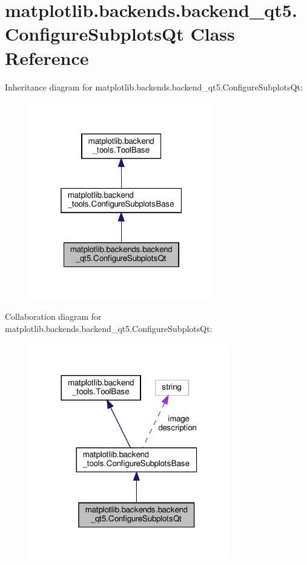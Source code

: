 \hypertarget{classmatplotlib_1_1backends_1_1backend__qt5_1_1ConfigureSubplotsQt}{}\section{matplotlib.\+backends.\+backend\+\_\+qt5.\+Configure\+Subplots\+Qt Class Reference}
\label{classmatplotlib_1_1backends_1_1backend__qt5_1_1ConfigureSubplotsQt}


Inheritance diagram for matplotlib.\+backends.\+backend\+\_\+qt5.\+Configure\+Subplots\+Qt\+:
\nopagebreak
\begin{figure}[H]
\begin{center}
\leavevmode
\includegraphics[width=229pt]{classmatplotlib_1_1backends_1_1backend__qt5_1_1ConfigureSubplotsQt__inherit__graph}
\end{center}
\end{figure}


Collaboration diagram for matplotlib.\+backends.\+backend\+\_\+qt5.\+Configure\+Subplots\+Qt\+:
\nopagebreak
\begin{figure}[H]
\begin{center}
\leavevmode
\includegraphics[width=248pt]{classmatplotlib_1_1backends_1_1backend__qt5_1_1ConfigureSubplotsQt__coll__graph}
\end{center}
\end{figure}

